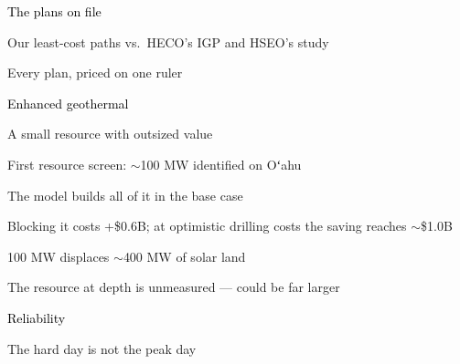\documentclass[11pt,aspectratio=169]{beamer}
\begin{document}
\begin{transitionframe}
  \begin{center}{\Huge \textcolor{black}{The plans on file}}\end{center}
\end{transitionframe}

\begin{frame}{Our least-cost paths vs.\ HECO's IGP and HSEO's study}
\end{frame}

\begin{frame}{Every plan, priced on one ruler}
\end{frame}

\begin{transitionframe}
  \begin{center}{\Huge \textcolor{black}{Enhanced geothermal}}\end{center}
\end{transitionframe}

\begin{frame}{A small resource with outsized value}
\begin{wideitemize}
  \item First resource screen: $\sim$100 MW identified on Oʻahu
  \item The model builds all of it in the base case
  \item Blocking it costs \textcolor{uhbrick}{+\$0.6B}; at optimistic
        drilling costs the saving reaches \textcolor{uhgreen}{$\sim$\$1.0B}
  \item 100 MW displaces $\sim$400 MW of solar land
  \item The resource at depth is unmeasured --- could be far larger
\end{wideitemize}
\end{frame}

\begin{transitionframe}
  \begin{center}{\Huge \textcolor{black}{Reliability}}\end{center}
\end{transitionframe}

\begin{frame}{The hard day is not the peak day}
\end{frame}
\end{document}
